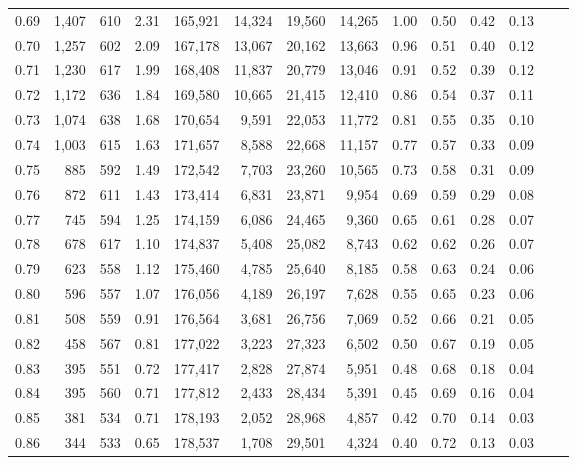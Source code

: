 \begin{tabular}{rrrrrrrrrrrrrr}
0.69 &  1,407 &  610 &    2.31 &  165,921 &   14,324 &  19,560 &  14,265 &  1.00 &  0.50 &  0.42 &      0.13 \\
0.70 &  1,257 &  602 &    2.09 &  167,178 &   13,067 &  20,162 &  13,663 &  0.96 &  0.51 &  0.40 &      0.12 \\
0.71 &  1,230 &  617 &    1.99 &  168,408 &   11,837 &  20,779 &  13,046 &  0.91 &  0.52 &  0.39 &      0.12 \\
0.72 &  1,172 &  636 &    1.84 &  169,580 &   10,665 &  21,415 &  12,410 &  0.86 &  0.54 &  0.37 &      0.11 \\
0.73 &  1,074 &  638 &    1.68 &  170,654 &    9,591 &  22,053 &  11,772 &  0.81 &  0.55 &  0.35 &      0.10 \\
0.74 &  1,003 &  615 &    1.63 &  171,657 &    8,588 &  22,668 &  11,157 &  0.77 &  0.57 &  0.33 &      0.09 \\
0.75 &    885 &  592 &    1.49 &  172,542 &    7,703 &  23,260 &  10,565 &  0.73 &  0.58 &  0.31 &      0.09 \\
0.76 &    872 &  611 &    1.43 &  173,414 &    6,831 &  23,871 &   9,954 &  0.69 &  0.59 &  0.29 &      0.08 \\
0.77 &    745 &  594 &    1.25 &  174,159 &    6,086 &  24,465 &   9,360 &  0.65 &  0.61 &  0.28 &      0.07 \\
0.78 &    678 &  617 &    1.10 &  174,837 &    5,408 &  25,082 &   8,743 &  0.62 &  0.62 &  0.26 &      0.07 \\
0.79 &    623 &  558 &    1.12 &  175,460 &    4,785 &  25,640 &   8,185 &  0.58 &  0.63 &  0.24 &      0.06 \\
0.80 &    596 &  557 &    1.07 &  176,056 &    4,189 &  26,197 &   7,628 &  0.55 &  0.65 &  0.23 &      0.06 \\
0.81 &    508 &  559 &    0.91 &  176,564 &    3,681 &  26,756 &   7,069 &  0.52 &  0.66 &  0.21 &      0.05 \\
0.82 &    458 &  567 &    0.81 &  177,022 &    3,223 &  27,323 &   6,502 &  0.50 &  0.67 &  0.19 &      0.05 \\
0.83 &    395 &  551 &    0.72 &  177,417 &    2,828 &  27,874 &   5,951 &  0.48 &  0.68 &  0.18 &      0.04 \\
0.84 &    395 &  560 &    0.71 &  177,812 &    2,433 &  28,434 &   5,391 &  0.45 &  0.69 &  0.16 &      0.04 \\
0.85 &    381 &  534 &    0.71 &  178,193 &    2,052 &  28,968 &   4,857 &  0.42 &  0.70 &  0.14 &      0.03 \\
0.86 &    344 &  533 &    0.65 &  178,537 &    1,708 &  29,501 &   4,324 &  0.40 &  0.72 &  0.13 &      0.03 \\

\end{tabular}
